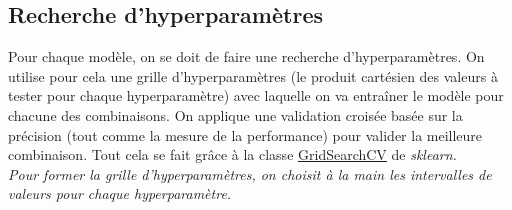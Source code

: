 \subsection{Recherche d'hyperparamètres}

Pour chaque modèle, on se doit de faire une recherche d'hyperparamètres. On utilise pour cela une grille d'hyperparamètres (le produit cartésien des valeurs à tester pour chaque hyperparamètre) avec laquelle on va entraîner le modèle pour chacune des combinaisons. On applique une validation croisée basée sur la précision (tout comme la mesure de la performance) pour valider la meilleure combinaison. Tout cela se fait grâce à la classe \href{https://scikit-learn.org/stable/modules/generated/sklearn.model_selection.GridSearchCV.html}{GridSearchCV} de \it{sklearn}.\\

Pour former la grille d'hyperparamètres, on choisit à la main les intervalles de valeurs pour chaque hyperparamètre.